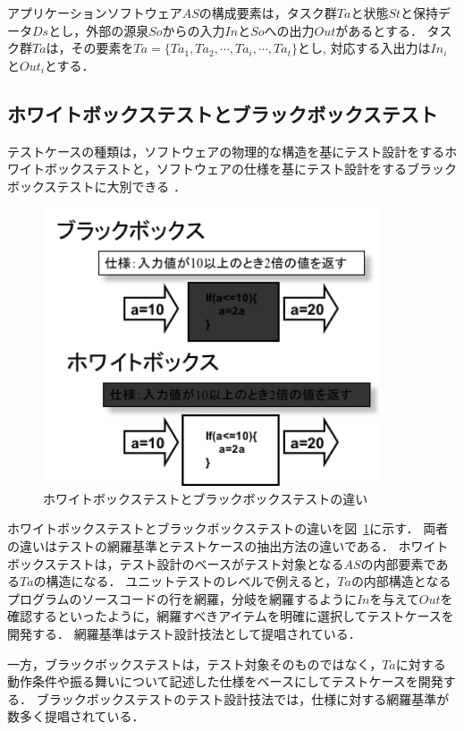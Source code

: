 アプリケーションソフトウェア$AS$の構成要素は，タスク群$Ta$と状態$St$と保持データ$Ds$とし，外部の源泉$So$からの入力$In$と$So$への出力$Out$があるとする．
タスク群$Ta$は，その要素を$Ta=\{Ta_1,Ta_2,\cdots,Ta_i,\cdots,Ta_t \}$とし, 対応する入出力は$In_i$と$Out_i$とする．
\subsection{ホワイトボックステストとブラックボックステスト}
テストケースの種類は，ソフトウェアの物理的な構造を基にテスト設計をするホワイトボックステストと，ソフトウェアの仕様を基にテスト設計をするブラックボックステストに大別できる\cite{myers2011art} ．

\begin{figure}[htbp]
  \begin{center}
  \includegraphics[width=10cm]{./image/BlackboxWhitebox.png}
  \caption{ホワイトボックステストとブラックボックステストの違い}
  \label{fig:D-2-Fig0}
  \end{center}
\end{figure}

ホワイトボックステストとブラックボックステストの違いを図~\ref{fig:D-2-Fig0}に示す．
両者の違いはテストの網羅基準とテストケースの抽出方法の違いである．
ホワイトボックステストは，テスト設計のベースがテスト対象となる$AS$の内部要素である$Ta$の構造になる．
ユニットテストのレベルで例えると，$Ta$の内部構造となるプログラムのソースコードの行を網羅，分岐を網羅するように$In$を与えて$Out$を確認するといったように，網羅すべきアイテムを明確に選択してテストケースを開発する．
網羅基準はテスト設計技法として提唱されている\cite{myers2011art}\cite{beiz90}\cite{copeland2004practitioner}．

一方，ブラックボックステストは，テスト対象そのものではなく，$Ta$に対する動作条件や振る舞いについて記述した仕様をベースにしてテストケースを開発する．
ブラックボックステストのテスト設計技法では，仕様に対する網羅基準が数多く提唱されている\cite{jorgensen2016software}\cite{binder2000testing}\cite{kaner1999testing}\cite{black2007pragmatic}．

